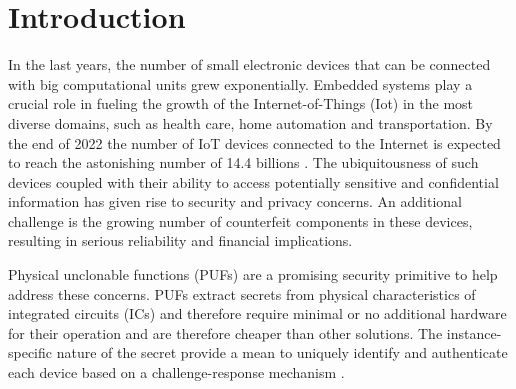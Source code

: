 \chapter{Introduction}


In the last years, the number of small electronic devices that can be connected with big computational units grew exponentially. Embedded systems play a crucial role in fueling the growth of the Internet-of-Things (Iot) in the most diverse domains, such as health care, home automation and transportation. By the end of 2022 the number of IoT devices connected to the Internet is expected to reach the astonishing number of 14.4 billions \cite{IoT_state}. The ubiquitousness of such devices coupled with their ability to access potentially sensitive and confidential information has given rise to security and privacy concerns. An additional challenge is the growing number of counterfeit
components in these devices, resulting in serious reliability and financial implications.

Physical unclonable functions (PUFs) are a promising security primitive to help address these concerns.  PUFs extract secrets from physical characteristics of integrated circuits (ICs)  \cite{PUF_IEEE_Herder} and therefore require minimal or no additional hardware for their operation and are therefore cheaper than other solutions. The instance-specific nature of the secret provide a mean to uniquely identify and authenticate each device based on a challenge-response mechanism \cite{PUF_Sutar}.

